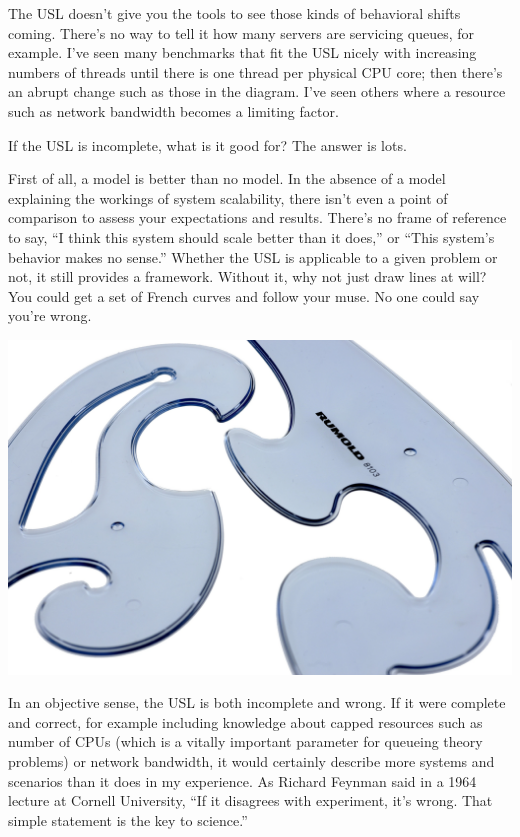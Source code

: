 \documentclass{vivid_layout}
\begin{document}
The USL doesn't give you the tools to see those kinds of behavioral shifts
coming. There's no way to tell it how many servers are servicing queues, for
example. I've seen many benchmarks that fit the USL nicely with increasing
numbers of threads until there is one thread per physical CPU core; then there's
an abrupt change such as those in the diagram. I've seen others where a resource
such as network bandwidth becomes a limiting factor.

If the USL is incomplete, what is it good for? The answer is lots.

First of all, a model is better than no model. In the absence of a model
explaining the workings of system scalability, there isn't even a point of
comparison to assess your expectations and results. There's no frame of
reference to say, ``I think this system should scale better than it does,'' or
``This system's behavior makes no sense.'' Whether the USL is applicable to a
given problem or not, it still provides a framework. Without it, why not just
draw lines at will? You could get a set of French curves and follow your muse.
No one could say you're wrong.
\begin{center}
\includegraphics[width=.85\linewidth,trim={0 8cm 0 0},clip]{scalability/french_curve}
\end{center}

In an objective sense, the USL is both incomplete and wrong.  If it were
complete and correct, for example including knowledge about capped resources
such as number of CPUs (which is a vitally important parameter for queueing
theory problems) or network bandwidth, it would certainly describe more systems
and scenarios than it does in my experience. As Richard Feynman said in a 1964
lecture at Cornell University, ``If it disagrees with experiment, it’s wrong.
That simple statement is the key to science.''
\end{document}
